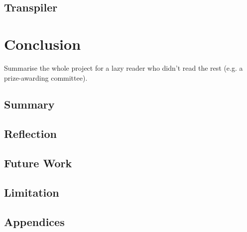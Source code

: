 \documentclass{l4proj}
\begin{document}
\section{Transpiler}

\chapter{Conclusion}    
Summarise the whole project for a lazy reader who didn't read the rest (e.g. a prize-awarding committee).
\section{Summary}
\section{Reflection}
\section{Future Work}
\section{Limitation}

%
% 

\begin{appendices}
\chapter{Appendices}
\end{appendices}






\end{document}
